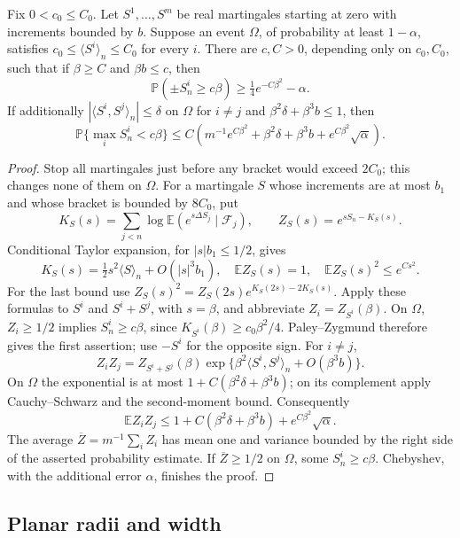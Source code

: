 \begin{lemma}\label{lem:lower-exp}
Fix $0<c_0\leq C_0$.  Let $S^1,\ldots,S^m$ be real
martingales starting at zero with increments bounded by $b$.
Suppose an event $\Omega$, of probability at least $1-\alpha$,
satisfies $c_0\leq\langle S^i\rangle_n\leq C_0$ for every $i$.
There are $c,C>0$, depending only on $c_0,C_0$, such that if
$\beta\geq C$ and $\beta b\leq c$, then
\[
 \mathbb P(\pm S_n^i\geq c\beta)
       \geq\tfrac14e^{-C\beta^2}-\alpha.
\]
If additionally
$|\langle S^i,S^j\rangle_n|\leq\delta$ on $\Omega$ for $i\ne j$
and $\beta^2\delta+\beta^3b\leq1$, then
\[
 \mathbb P\{\max_i S_n^i<c\beta\}
 \leq C\left(m^{-1}e^{C\beta^2}+\beta^2\delta+
                    \beta^3b+e^{C\beta^2}\sqrt\alpha\right).
\]
\end{lemma}
\begin{proof}
Stop all martingales just before any bracket would exceed $2C_0$;
this changes none of them on $\Omega$.  For a martingale $S$ whose
increments are at most $b_1$ and whose bracket is bounded by $8C_0$,
put
\[
 K_S(s)=\sum_{j<n}\log\mathbb E(e^{s\Delta S_j}\mid\mathcal F_j),
 \qquad Z_S(s)=e^{sS_n-K_S(s)}.
\]
Conditional Taylor expansion, for $|s|b_1\leq1/2$, gives
\[
 K_S(s)=\tfrac12s^2\langle S\rangle_n+O(|s|^3b_1),
 \quad \mathbb E Z_S(s)=1,
 \quad \mathbb E Z_S(s)^2\leq e^{Cs^2}.
\]
For the last bound use
$Z_S(s)^2=Z_S(2s)e^{K_S(2s)-2K_S(s)}$.
Apply these formulas to $S^i$ and $S^i+S^j$, with $s=\beta$,
and abbreviate $Z_i=Z_{S^i}(\beta)$.
On $\Omega$, $Z_i\geq1/2$ implies $S_n^i\geq c\beta$,
since $K_{S^i}(\beta)\geq c_0\beta^2/4$.
Paley--Zygmund therefore gives the first assertion; use $-S^i$
for the opposite sign.
For $i\ne j$,
\[
 Z_iZ_j=Z_{S^i+S^j}(\beta)
       \exp\{\beta^2\langle S^i,S^j\rangle_n+O(\beta^3b)\}.
\]
On $\Omega$ the exponential is at most
$1+C(\beta^2\delta+\beta^3b)$; on its complement apply
Cauchy--Schwarz and the second-moment bound.  Consequently
\[
 \mathbb E Z_iZ_j\leq1+C(\beta^2\delta+\beta^3b)
                              +e^{C\beta^2}\sqrt\alpha.
\]
The average $\overline Z=m^{-1}\sum_i Z_i$ has mean one and
variance bounded by the right side of the asserted probability
estimate.  If $\overline Z\geq1/2$ on $\Omega$, some
$S_n^i\geq c\beta$.  Chebyshev, with the additional error $\alpha$,
finishes the proof.
\end{proof}

\subsection{Planar radii and width}

